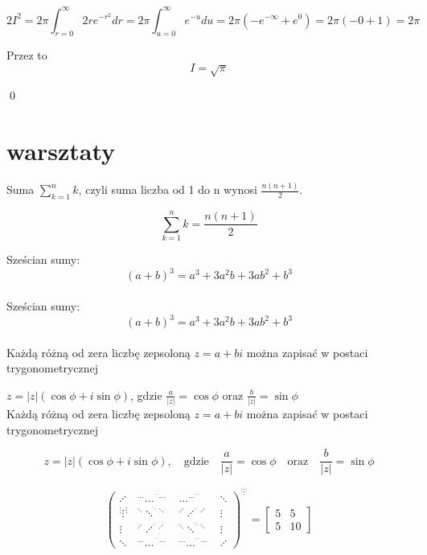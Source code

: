 \documentclass[11pt]{article}
\theoremstyle{definition}
\theoremstyle{plain}
\theoremstyle{remark}
\begin{document}
$$ 2I^2 = 2\pi \int_{r=0}^{\infty} 2re^{-r^2} dr = 2\pi \int_{u=0}^{\infty} e^{-u} du = 2\pi (-e^{-\infty} + e^{0}) = 2\pi (-0+1) = 2\pi $$ 

Przez to $$ I = \sqrt{\pi}$$

\qed

\newpage
\section*{warsztaty}

Suma $\sum_{k=1}^{n} k$, czyli suma liczba od 1 do n wynosi $\frac{n(n+1)}{2}$.

$$ \sum_{k=1}^{n} k = \frac{n(n+1)}{2} $$

Sześcian sumy: $$ (a + b)^3 = a^3 + 3a^2b + 3ab^2 + b^3 $$
\\

Sześcian sumy:
\begin{equation}
	(a + b)^3 = a^3 + 3a^2b + 3ab^2 + b^3 	
\end{equation}
\\

Każdą różną od zera liczbę zepsoloną $z = a+bi$ można zapisać w postaci trygonometrycznej

$z = |z|(\cos\phi + i\sin\phi)$, gdzie $\frac{a}{|z|} = \cos\phi$ oraz $\frac{b}{|z|} = \sin\phi$ 
\\


Każdą różną od zera liczbę zepsoloną $z = a+bi$ można zapisać w postaci trygonometrycznej

\begin{equation}
	z = |z|(\cos\phi + i\sin\phi),\quad \textrm{gdzie}\quad \frac{a}{|z|} = \cos\phi\quad \textrm{oraz}\quad \frac{b}{|z|} = \sin\phi 
\end{equation}

\[
{\left( \begin{array}{cccc}
		\iddots  & {^{\dots}{\dots}^{^{\dots}{\dots}}} & \dots^{\dots^{\dots}} & \ddots\\
		{^{\vdots}{\vdots}^{^{\vdots}{\vdots}}}  & {^{\ddots}{\ddots}^{^{\ddots}{\ddots}}} & {^{\iddots}{\iddots}^{^{\iddots}{\iddots}}} & \vdots\\
		\vdots  & {^{\iddots}{\iddots}^{^{\iddots}{\iddots}}} & {^{\ddots}{\ddots}^{^{\ddots}{\ddots}}} & \vdots\\
		\ddots  & {^{\dots}{\dots}^{^{\dots}{\dots}}}  & {^{\dots}{\dots}^{^{\dots}{\dots}}}  &\iddots 
	\end{array} \right)}^{{^{\vdots}{\vdots}^{^{\vdots}{\vdots}}}}
=
\left[ \begin{array}{ccc}
	5 & 5\\
	5 & 10
\end{array} \right]
\]
\end{document}
